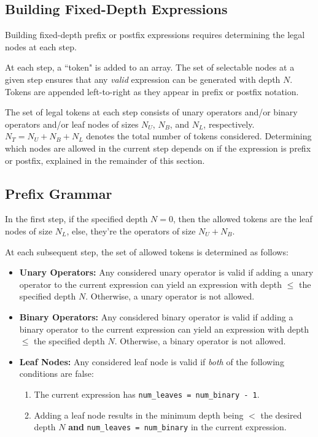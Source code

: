 \documentclass[runningheads]{llncs}
\begin{document}
\subsection{Building Fixed-Depth Expressions}
Building fixed-depth prefix or postfix expressions requires determining the legal nodes at each step. 
\par At each step, a ``token" is added to an array. The set of selectable nodes at a given step ensures that any \emph{valid} expression can be generated with depth $N$. Tokens are appended left-to-right as they appear in prefix or postfix notation. 
\par The set of legal tokens at each step consists of unary operators and/or binary operators and/or leaf nodes of sizes $N_U$, $N_B$, and  $N_L$, respectively. $N_{T} = N_U + N_B + N_L$ denotes the total number of tokens considered. Determining which nodes are allowed in the current step depends on if the expression is prefix or postfix, explained in the remainder of this section.
\subsection{Prefix Grammar}\label{subsec:prefix_grammar}
In the first step, if the specified depth $N=0$, then the allowed tokens are the leaf nodes of size $N_L$, else, they're the operators of size $N_U + N_B$.
\par At each subsequent step, the set of allowed tokens is determined as follows:
\begin{itemize}
    \item \textbf{Unary Operators: }
    Any considered unary operator is valid if adding a unary operator to the current expression can yield an expression with depth $\leq$ the specified depth $N$. Otherwise, a unary operator is not allowed.
    \item \textbf{Binary Operators:}
    Any considered binary operator is valid if adding a binary operator to the current expression can yield an expression with depth $\leq$ the specified depth $N$. Otherwise, a binary operator is not allowed.
    \item \textbf{Leaf Nodes: }
    Any considered leaf node is valid if \emph{both} of the following conditions are false:
    \begin{enumerate}
    \item The current expression has \texttt{num\_leaves = num\_binary - 1}.
    \item Adding a leaf node results in the minimum depth being $<$ the desired depth $N$ \textbf{and} \texttt{num\_leaves = num\_binary} in the current expression.
    \end{enumerate}
\end{itemize}
\end{document}
